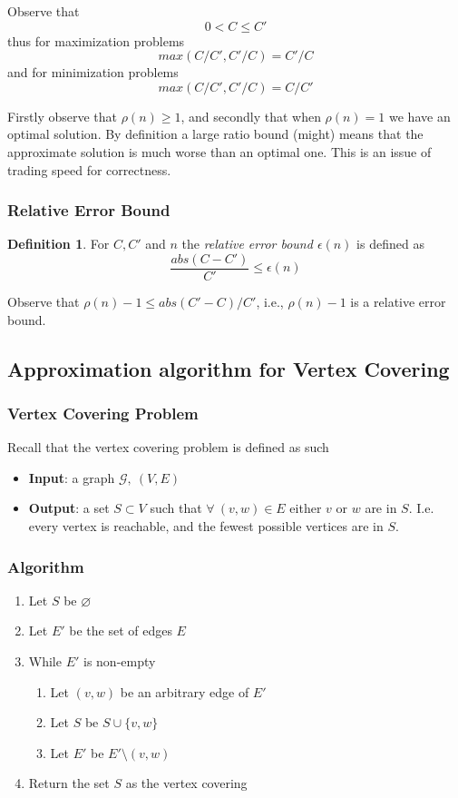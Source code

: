 \documentclass{article}
\theoremstyle{definition}
\newtheorem{definition}{Definition}[section]
\newcommand{\G}{\mathcal{G}}
\begin{document}
Observe that
$$ 0 < C \leq C\prime $$
thus for maximization problems
$$ max(C/C\prime, C\prime/C) = C\prime/C $$
and for minimization problems
$$ max(C/C\prime, C\prime/C) = C/C\prime $$

Firstly observe that $\rho(n) \geq 1$,
and secondly that when $\rho(n) = 1$ we have an optimal solution.
By definition a large ratio bound (might) means that the approximate
solution is much worse than an optimal one.
This is an issue of trading speed for correctness.

\subsubsection{Relative Error Bound}
\begin{definition}
    For $C, C\prime$ and $n$  the \textit{relative error bound $\epsilon(n)$} is defined as
    $$\frac{abs(C - C\prime)}{C\prime} \leq \epsilon(n)$$
\end{definition}

Observe that $\rho(n) - 1 \leq abs(C\prime - C)/C\prime$,
i.e., $\rho(n) - 1$ is a relative error bound.

\subsection{Approximation algorithm for Vertex Covering}
\subsubsection{Vertex Covering Problem}
Recall that the vertex covering problem is defined as such
\begin{itemize}
    \item \textbf{Input}:
        a graph $\G,\ (V,E)$
    \item \textbf{Output}:
        a set $S \subset V$ such that $\forall\ (v,w) \in E$
        either $v$ or $w$ are in $S$.
        I.e. every vertex is reachable,
        and the fewest possible vertices are in $S$.
\end{itemize}

\subsubsection{Algorithm}
\begin{enumerate}
    \item Let $S$ be $\varnothing$
    \item Let $E\prime$ be the set of edges $E$
    \item While $E\prime$ is non-empty
        \begin{enumerate}
            \item
                Let $(v,w)$ be an arbitrary edge of $E\prime$
            \item
                Let $S$ be $S \cup \{v,w\}$
            \item
                Let $E\prime$ be $E\prime \setminus (v,w)$
        \end{enumerate}
    \item Return the set $S$ as the vertex covering

\end{enumerate}
\end{document}
